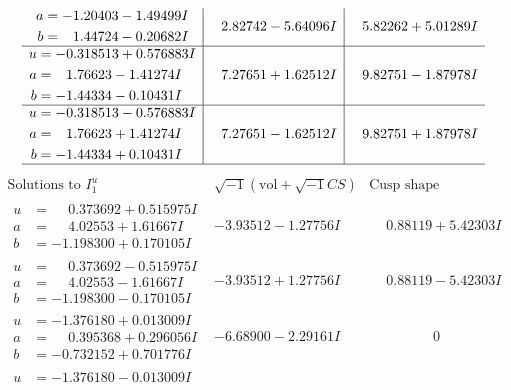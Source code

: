 \documentclass[1p]{elsarticle_modified}
\theoremstyle{definition}
\newcommand{\I}{\sqrt{-1}}
\begin{document}
$$\begin{array}{c|c|c}
\begin{aligned}
a &= -1.20403 - 1.49499 I \\
b &= \phantom{-}1.44724 - 0.20682 I\end{aligned}
 & \phantom{-}2.82742 - 5.64096 I & \phantom{-}5.82262 + 5.01289 I \\ \hline\begin{aligned}
u &= -0.318513 + 0.576883 I \\
a &= \phantom{-}1.76623 - 1.41274 I \\
b &= -1.44334 - 0.10431 I\end{aligned}
 & \phantom{-}7.27651 + 1.62512 I & \phantom{-}9.82751 - 1.87978 I \\ \hline\begin{aligned}
u &= -0.318513 - 0.576883 I \\
a &= \phantom{-}1.76623 + 1.41274 I \\
b &= -1.44334 + 0.10431 I\end{aligned}
 & \phantom{-}7.27651 - 1.62512 I & \phantom{-}9.82751 + 1.87978 I\\
 \hline 
 \end{array}$$\newpage$$\begin{array}{c|c|c}  
\text{Solutions to }I^u_{1}& \I (\text{vol} + \sqrt{-1}CS) & \text{Cusp shape}\\
 \hline 
\begin{aligned}
u &= \phantom{-}0.373692 + 0.515975 I \\
a &= \phantom{-}4.02553 + 1.61667 I \\
b &= -1.198300 + 0.170105 I\end{aligned}
 & -3.93512 - 1.27756 I & \phantom{-}0.88119 + 5.42303 I \\ \hline\begin{aligned}
u &= \phantom{-}0.373692 - 0.515975 I \\
a &= \phantom{-}4.02553 - 1.61667 I \\
b &= -1.198300 - 0.170105 I\end{aligned}
 & -3.93512 + 1.27756 I & \phantom{-}0.88119 - 5.42303 I \\ \hline\begin{aligned}
u &= -1.376180 + 0.013009 I \\
a &= \phantom{-}0.395368 + 0.296056 I \\
b &= -0.732152 + 0.701776 I\end{aligned}
 & -6.68900 - 2.29161 I & \phantom{-0.000000 } 0 \\ \hline\begin{aligned}
u &= -1.376180 - 0.013009 I \\

\end{aligned}
\end{array}$$
\end{document}

